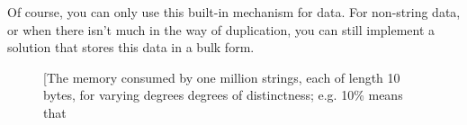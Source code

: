 Of course, you can only use this built-in mechanism for  data. For
non-string data, or when there isn't much in the way of duplication, you can
still implement a solution that stores this data in a bulk form.

\begin{figure}
\centering
	\qquad
	\qquad
	\qquad
	\subfigure[The memory consumed by one million strings, each of length 10
	bytes, for varying degrees degrees of distinctness; e.g. 10\% means that

\end{figure}
